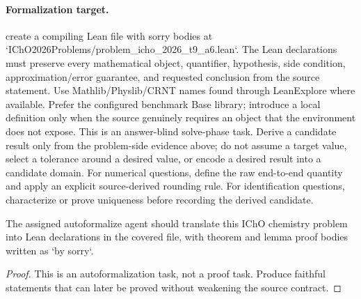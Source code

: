 \paragraph{Formalization target.}
create a compiling Lean file with sorry bodies at `IChO2026Problems/problem\_icho\_2026\_t9\_a6.lean`.
The Lean declarations must preserve every mathematical object, quantifier, hypothesis, side condition, approximation/error guarantee, and requested conclusion from the source statement.
Use Mathlib/Physlib/CRNT names found through LeanExplore where available. Prefer the configured benchmark Base library; introduce a local definition only when the source genuinely requires an object that the environment does not expose.
This is an answer-blind solve-phase task. Derive a candidate result only from the problem-side evidence above; do not assume a target value, select a tolerance around a desired value, or encode a desired result into a candidate domain.
For numerical questions, define the raw end-to-end quantity and apply an explicit source-derived rounding rule. For identification questions, characterize or prove uniqueness before recording the derived candidate.

\begin{theorem}
\label{thm:physics:icho_2026_t9_a6:target}
The assigned autoformalize agent should translate this IChO chemistry problem into Lean declarations in the covered file, with theorem and lemma proof bodies written as `by sorry`.
\end{theorem}
\begin{proof}
This is an autoformalization task, not a proof task. Produce faithful statements that can later be proved without weakening the source contract.
\end{proof}
